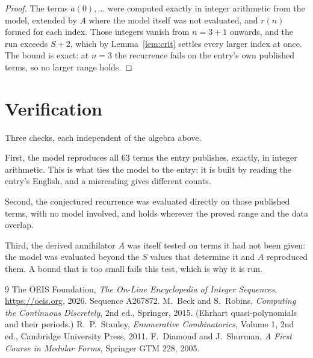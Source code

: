 \documentclass[11pt,a4paper]{article}
\theoremstyle{plain}
\theoremstyle{definition}
\begin{document}
\begin{proof}
The terms $a(0),\dots$ were computed exactly in integer arithmetic from the model, extended by
$A$ where the model itself was not evaluated, and $r(n)$ formed for each index. Those integers
vanish from $n=3+1$ onwards, and the run exceeds $S+2$, which by
Lemma~\ref{lem:crit} settles every larger index at once. The bound is exact: at $n=3$ the recurrence fails on the entry's own published terms, so no larger range holds.
\end{proof}

\section{Verification}

Three checks, each independent of the algebra above.

First, the model reproduces all $63$ terms the entry publishes, exactly, in integer
arithmetic. This is what ties the model to the entry: it is built by reading the entry's
English, and a misreading gives different counts.

Second, the conjectured recurrence was evaluated directly on those published terms, with no
model involved, and holds wherever the proved range and the data overlap.

Third, the derived annihilator $A$ was itself tested on terms it had not been given: the model
was evaluated beyond the $S$ values that determine it and $A$ reproduced them. A bound that is
too small fails this test, which is why it is run.

\begin{thebibliography}{9}
 The OEIS Foundation, \emph{The On-Line Encyclopedia of Integer
Sequences}, \url{https://oeis.org}, 2026. Sequence A267872.
 M.~Beck and S.~Robins, \emph{Computing the Continuous Discretely},
2nd ed., Springer, 2015. (Ehrhart quasi-polynomials and their periods.)
 R.~P.~Stanley, \emph{Enumerative Combinatorics}, Volume 1, 2nd ed.,
Cambridge University Press, 2011.
 F.~Diamond and J.~Shurman, \emph{A First Course in Modular Forms},
Springer GTM 228, 2005.
\end{thebibliography}
\end{document}
